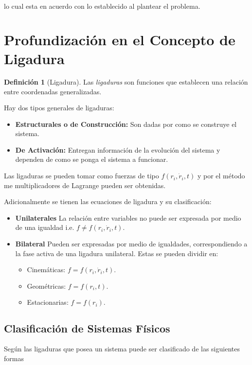 \documentclass{article}
\theoremstyle{definition}
\newtheorem*{definition}{Definición}
\begin{document}
lo cual esta en acuerdo con lo establecido al plantear el problema.

\section{Profundización en el Concepto de Ligadura}
\begin{definition}[Ligadura]
	Las \emph{ligaduras} son funciones que establecen una relación entre coordenadas generalizadas.
\end{definition}

Hay dos tipos generales de ligaduras:

\begin{itemize}
	\item \textbf{Estructurales o de Construcción:} Son dadas por como se construye el sistema.
	\item \textbf{De Activación:} Entregan información de la evolución del sistema y dependen de como se ponga el sistema a funcionar.
\end{itemize}

Las ligaduras se pueden tomar como fuerzas de tipo $f(r_i, \dot{r}_i, t)$ y por el método me multiplicadores de Lagrange pueden ser obtenidas.

Adicionalmente se tienen las ecuaciones de ligadura y su clasificación:

\begin{itemize}
	\item \textbf{Unilaterales} La relación entre variables no puede ser expresada por medio de una igualdad i.e. $f \ne f(r_i, \dot{r}_i, t)$.
	\item \textbf{Bilateral} Pueden ser expresadas por medio de igualdades, correspondiendo a la fase activa de una ligadura unilateral. Estas se pueden dividir en:
		\begin{itemize}
			\item Cinemáticas: $f = f(r_i, \dot{r}_i, t)$.
			\item Geométricas: $f = f(r_i, t)$.
			\item Estacionarias: $f = f(r_i)$.
		\end{itemize}
\end{itemize}

\subsection{Clasificación de Sistemas Físicos}
Según las ligaduras que posea un sistema puede ser clasificado de las siguientes formas
\end{document}
